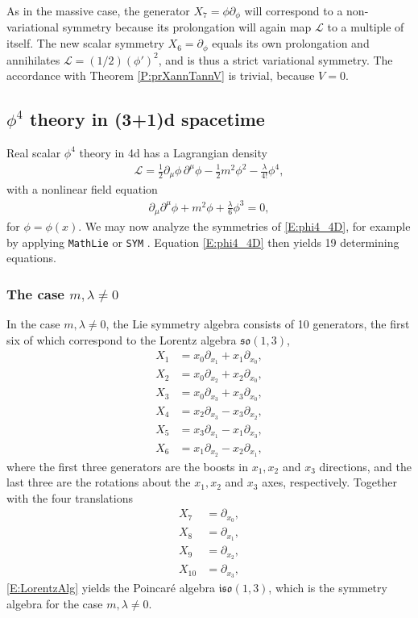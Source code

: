 \documentclass[a4paper,hidelinks, 12pt]{article}
\numberwithin{equation}{section}
\theoremstyle{plain}
\newcommand{\La}{\mathfrak}
\newcommand{\nn}{\nonumber}
\newcommand{\mc}{\mathcal}
\begin{document}
As in the massive case, the generator $X_7=\phi \partial_\phi$ will correspond to a non-variational symmetry because its prolongation will again map $\mc{L}$ to a multiple of itself. The new scalar symmetry $X_6=\partial_\phi$ equals its own prolongation and annihilates
$\mc{L}=(1/2)(\phi')^2$, and is thus a strict variational symmetry. The accordance with Theorem \ref{P:prXannTannV}  is trivial, because $V=0$.
\subsection{$\phi^4$ theory in (3+1)d spacetime}
\label{sec:Phi4TheoryIn31DSpacetime}
Real scalar $\phi^4$ theory in 4d has a Lagrangian density
\begin{align}
	\mathcal{L} = \frac{1}{2} \partial_\mu \phi \, \partial^\mu \phi - \frac{1}{2} m^2 \phi^2 - \frac{\lambda}{4!} \phi^4,
\end{align}
with a nonlinear field equation
	\begin{align}\label{E:phi4_4D}
  \partial_\mu \partial^\mu \phi + m^2 \phi +\frac{\lambda}{6} \phi^3=0,
\end{align}
for $\phi=\phi(x)$. We may now analyze the symmetries of \eqref{E:phi4_4D}, for example by applying \texttt{MathLie} \cite{baumann2013symmetry} or \texttt{SYM} \cite{dimas2005sym}. 
Equation \eqref{E:phi4_4D} then yields 19 determining equations.
\subsubsection{The case $m,\lambda\ne 0$}
\label{sec:TheCaseMLambdaNe0}
In the case $m,\lambda \ne 0$, the Lie symmetry algebra consists of 10 generators, the first six of which correspond to the Lorentz algebra $\La{so}(1,3)$,
\begin{align}\label{E:LorentzAlg}
	X_1 &= x_0 \partial_{x_1}  + x_1 \partial_{x_0},  \nn \\
	X_2 &= x_0 \partial_{x_2}  + x_2 \partial_{x_0},  \nn \\
	X_3 &= x_0 \partial_{x_3}  + x_3 \partial_{x_0},   \nn \\
	X_4 &=  x_2 \partial_{x_3} - x_3 \partial_{x_2},     \nn \\
	X_5 &=  x_3 \partial_{x_1} - x_1 \partial_{x_3},    \nn \\
X_6 &=   x_1 \partial_{x_2}  -x_2 \partial_{x_1},
\end{align}
where the first three generators are the boosts in $x_1, x_2$ and $x_3$ directions, and the last three are the rotations about the $x_1, x_2$ and $x_3$ axes, respectively.
Together with the four translations
\begin{align}\label{E:PoincareTrans}
  		X_7 &= \partial_{x_0},\nn \\
	X_8 &=  \partial_{x_1},  \nn \\
	X_9 &= \partial_{x_2},  \nn \\
	X_{10} &=\partial_{x_3},
\end{align}
\eqref{E:LorentzAlg} yields the Poincaré algebra $\La{iso}(1,3)$, which is the symmetry algebra for the case $m,\lambda\ne 0$.
\end{document}
